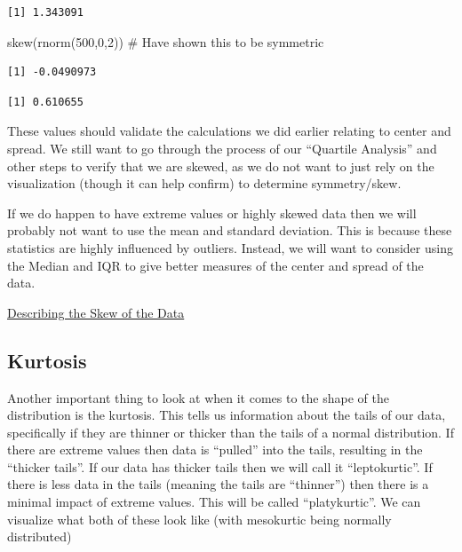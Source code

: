 \documentclass[
  letterpaper,
  DIV=11,
  numbers=noendperiod]{scrreprt}
\newenvironment{Shaded}{\begin{snugshade}}{\end{snugshade}}
\newcommand{\CommentTok}[1]{\textcolor[rgb]{0.37,0.37,0.37}{#1}}
\newcommand{\DecValTok}[1]{\textcolor[rgb]{0.68,0.00,0.00}{#1}}
\newcommand{\FunctionTok}[1]{\textcolor[rgb]{0.28,0.35,0.67}{#1}}
\newcommand{\NormalTok}[1]{\textcolor[rgb]{0.00,0.23,0.31}{#1}}
\newcommand{\SpecialCharTok}[1]{\textcolor[rgb]{0.37,0.37,0.37}{#1}}
\begin{document}
\begin{verbatim}
[1] 1.343091
\end{verbatim}

\begin{Shaded}
\begin{Highlighting}[]
\FunctionTok{skew}\NormalTok{(}\FunctionTok{rnorm}\NormalTok{(}\DecValTok{500}\NormalTok{,}\DecValTok{0}\NormalTok{,}\DecValTok{2}\NormalTok{)) }\CommentTok{\# Have shown this to be symmetric}
\end{Highlighting}
\end{Shaded}

\begin{verbatim}
[1] -0.0490973
\end{verbatim}

\begin{Shaded}
\end{Shaded}

\begin{verbatim}
[1] 0.610655
\end{verbatim}

These values should validate the calculations we did earlier relating to
center and spread. We still want to go through the process of our
``Quartile Analysis'' and other steps to verify that we are skewed, as
we do not want to just rely on the visualization (though it can help
confirm) to determine symmetry/skew.

If we do happen to have extreme values or highly skewed data then we
will probably not want to use the mean and standard deviation. This is
because these statistics are highly influenced by outliers. Instead, we
will want to consider using the Median and IQR to give better measures
of the center and spread of the data.

\begin{watch}{}{}
    \href{https://youtu.be/_VHtL0hgaKA}{Describing the Skew of the Data}
\end{watch}

\subsection{Kurtosis}\label{kurtosis}

Another important thing to look at when it comes to the shape of the
distribution is the kurtosis. This tells us information about the tails
of our data, specifically if they are thinner or thicker than the tails
of a normal distribution. If there are extreme values then data is
``pulled'' into the tails, resulting in the ``thicker tails''. If our
data has thicker tails then we will call it ``leptokurtic''. If there is
less data in the tails (meaning the tails are ``thinner'') then there is
a minimal impact of extreme values. This will be called ``platykurtic''.
We can visualize what both of these look like (with mesokurtic being
normally distributed)
\end{document}
